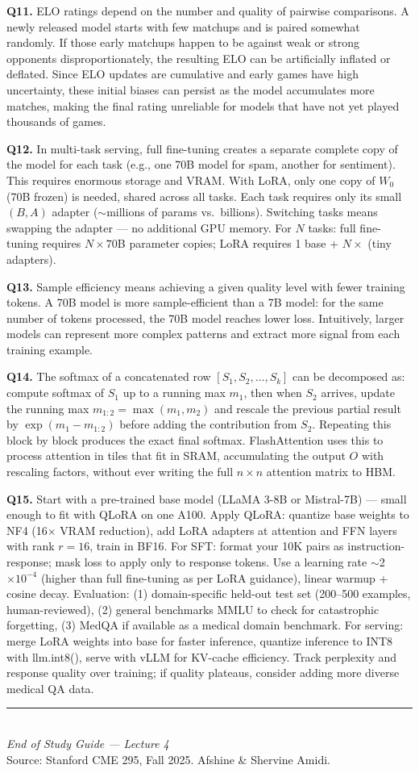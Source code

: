 \documentclass[11pt, a4paper]{article}
\begin{document}
\textbf{Q11.} ELO ratings depend on the number and quality of pairwise comparisons. A newly released model starts with few matchups and is paired somewhat randomly. If those early matchups happen to be against weak or strong opponents disproportionately, the resulting ELO can be artificially inflated or deflated. Since ELO updates are cumulative and early games have high uncertainty, these initial biases can persist as the model accumulates more matches, making the final rating unreliable for models that have not yet played thousands of games.

\textbf{Q12.} In multi-task serving, full fine-tuning creates a separate complete copy of the model for each task (e.g., one 70B model for spam, another for sentiment). This requires enormous storage and VRAM. With LoRA, only one copy of $W_0$ (70B frozen) is needed, shared across all tasks. Each task requires only its small $(B, A)$ adapter ($\sim$millions of params vs.\ billions). Switching tasks means swapping the adapter --- no additional GPU memory. For $N$ tasks: full fine-tuning requires $N \times 70$B parameter copies; LoRA requires 1 base + $N \times$ (tiny adapters).

\textbf{Q13.} Sample efficiency means achieving a given quality level with fewer training tokens. A 70B model is more sample-efficient than a 7B model: for the same number of tokens processed, the 70B model reaches lower loss. Intuitively, larger models can represent more complex patterns and extract more signal from each training example.

\textbf{Q14.} The softmax of a concatenated row $[S_1, S_2, \ldots, S_k]$ can be decomposed as: compute softmax of $S_1$ up to a running max $m_1$, then when $S_2$ arrives, update the running max $m_{1:2} = \max(m_1, m_2)$ and rescale the previous partial result by $\exp(m_1 - m_{1:2})$ before adding the contribution from $S_2$. Repeating this block by block produces the exact final softmax. FlashAttention uses this to process attention in tiles that fit in SRAM, accumulating the output $O$ with rescaling factors, without ever writing the full $n \times n$ attention matrix to HBM.

\textbf{Q15.} Start with a pre-trained base model (LLaMA 3-8B or Mistral-7B) --- small enough to fit with QLoRA on one A100. Apply QLoRA: quantize base weights to NF4 (16$\times$ VRAM reduction), add LoRA adapters at attention and FFN layers with rank $r=16$, train in BF16. For SFT: format your 10K pairs as instruction-response; mask loss to apply only to response tokens. Use a learning rate $\sim$2$\times 10^{-4}$ (higher than full fine-tuning as per LoRA guidance), linear warmup + cosine decay. Evaluation: (1) domain-specific held-out test set (200--500 examples, human-reviewed), (2) general benchmarks MMLU to check for catastrophic forgetting, (3) MedQA if available as a medical domain benchmark. For serving: merge LoRA weights into base for faster inference, quantize inference to INT8 with llm.int8(), serve with vLLM for KV-cache efficiency. Track perplexity and response quality over training; if quality plateaus, consider adding more diverse medical QA data.

\vspace{1em}
\begin{center}
\rule{0.5\textwidth}{0.4pt}\\[6pt]
{\small\textit{End of Study Guide --- Lecture 4}}\\[4pt]
{\small Source: Stanford CME 295, Fall 2025. Afshine \& Shervine Amidi.}
\end{center}
\end{document}
